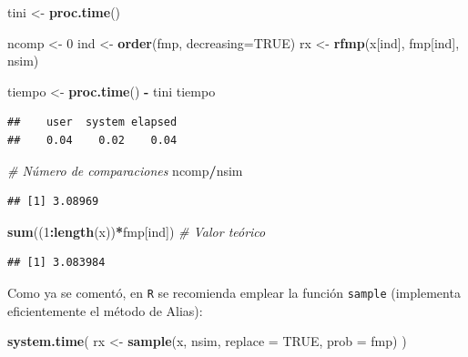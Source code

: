 \documentclass[]{book}
\newenvironment{Shaded}{\begin{snugshade}}{\end{snugshade}}
\newcommand{\KeywordTok}[1]{\textcolor[rgb]{0.13,0.29,0.53}{\textbf{#1}}}
\newcommand{\DataTypeTok}[1]{\textcolor[rgb]{0.13,0.29,0.53}{#1}}
\newcommand{\DecValTok}[1]{\textcolor[rgb]{0.00,0.00,0.81}{#1}}
\newcommand{\StringTok}[1]{\textcolor[rgb]{0.31,0.60,0.02}{#1}}
\newcommand{\CommentTok}[1]{\textcolor[rgb]{0.56,0.35,0.01}{\textit{#1}}}
\newcommand{\OtherTok}[1]{\textcolor[rgb]{0.56,0.35,0.01}{#1}}
\newcommand{\OperatorTok}[1]{\textcolor[rgb]{0.81,0.36,0.00}{\textbf{#1}}}
\newcommand{\NormalTok}[1]{#1}
\theoremstyle{definition}
\theoremstyle{definition}
\theoremstyle{definition}
\theoremstyle{remark}
\begin{document}
\begin{Shaded}
\begin{Highlighting}[]
\NormalTok{tini <-}\StringTok{ }\KeywordTok{proc.time}\NormalTok{()}

\NormalTok{ncomp <-}\StringTok{ }\DecValTok{0}
\NormalTok{ind <-}\StringTok{ }\KeywordTok{order}\NormalTok{(fmp, }\DataTypeTok{decreasing=}\OtherTok{TRUE}\NormalTok{)}
\NormalTok{rx <-}\StringTok{ }\KeywordTok{rfmp}\NormalTok{(x[ind], fmp[ind], nsim)}

\NormalTok{tiempo <-}\StringTok{ }\KeywordTok{proc.time}\NormalTok{() }\OperatorTok{-}\StringTok{ }\NormalTok{tini}
\NormalTok{tiempo}
\end{Highlighting}
\end{Shaded}

\begin{verbatim}
##    user  system elapsed 
##    0.04    0.02    0.04
\end{verbatim}

\begin{Shaded}
\begin{Highlighting}[]
\CommentTok{# Número de comparaciones}
\NormalTok{ncomp}\OperatorTok{/}\NormalTok{nsim}
\end{Highlighting}
\end{Shaded}

\begin{verbatim}
## [1] 3.08969
\end{verbatim}

\begin{Shaded}
\begin{Highlighting}[]
\KeywordTok{sum}\NormalTok{((}\DecValTok{1}\OperatorTok{:}\KeywordTok{length}\NormalTok{(x))}\OperatorTok{*}\NormalTok{fmp[ind]) }\CommentTok{# Valor teórico}
\end{Highlighting}
\end{Shaded}

\begin{verbatim}
## [1] 3.083984
\end{verbatim}

Como ya se comentó, en \texttt{R} se recomienda emplear la función
\texttt{sample} (implementa eficientemente el método de Alias):

\begin{Shaded}
\begin{Highlighting}[]
\KeywordTok{system.time}\NormalTok{( rx <-}\StringTok{ }\KeywordTok{sample}\NormalTok{(x, nsim, }\DataTypeTok{replace =} \OtherTok{TRUE}\NormalTok{, }\DataTypeTok{prob =}\NormalTok{ fmp) )}
\end{Highlighting}
\end{Shaded}
\end{document}
